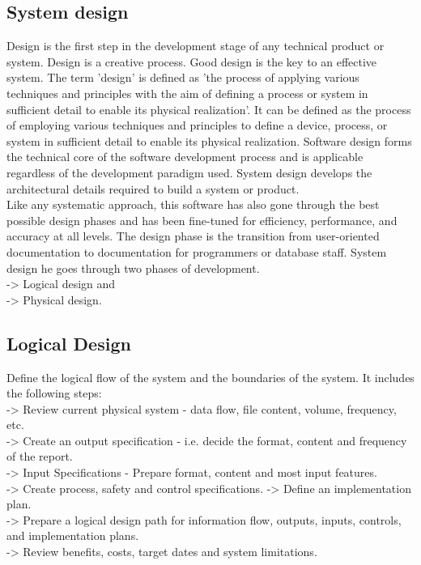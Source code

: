 \documentclass{article}
\begin{document}
\subsection{System design}
Design is the first step in the development stage of any technical product or system. Design is a creative process. Good design is the key to an effective system. The term 'design' is defined as 'the process of applying various techniques and principles with the aim of defining a process or system in sufficient detail to enable its physical realization'. It can be defined as the process of employing various techniques and principles to define a device, process, or system in sufficient detail to enable its physical realization. Software design forms the technical core of the software development process and is applicable regardless of the development paradigm used. System design develops the architectural details required to build a system or product. \\Like any systematic approach, this software has also gone through the best possible design phases and has been fine-tuned for efficiency, performance, and accuracy at all levels. The design phase is the transition from user-oriented documentation to documentation for programmers or database staff. System design he goes through two phases of development.
\\-> Logical design and\\ -> Physical design.

\subsection{Logical Design}
Define the logical flow of the system and the boundaries of the system. It includes the following steps:
\\-> Review current physical system - data flow, file content, volume, frequency, etc. \\-> Create an output specification - i.e. decide the format, content and frequency of the report.\\ -> Input Specifications - Prepare format, content and most input features.\\ -> Create process, safety and control specifications. -> Define an implementation plan. \\-> Prepare a logical design path for information flow, outputs, inputs, controls, and implementation plans.\\ -> Review benefits, costs, target dates and system limitations.
\end{document}

